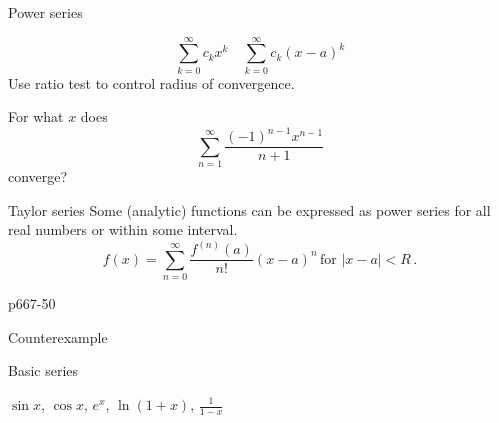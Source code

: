 \begin{frame}{Power series}


\[
\sum_{k=0}^{\infty}c_{k}x^{k}\quad\sum_{k=0}^{\infty}c_{k}\left(x-a\right)^{k}
\]
Use ratio test to control radius of convergence.



\begin{example}
For what $x$ does
\[
\sum_{n=1}^{\infty}\frac{\left(-1\right)^{n-1}x^{n-1}}{n+1}
\]
converge?
\end{example}

\end{frame}

\begin{frame}{Taylor series}
Some (\alert{analytic}) functions can be expressed as power series for all real numbers
or within some interval.
\[
f\left(x\right)=\sum_{n=0}^{\infty}\frac{f^{\left(n\right)}\left(a\right)}{n!}\left(x-a\right)^{n}\,\mbox{for }\left|x-a\right|<R\,.
\]

\begin{example}
p667-50
\end{example}

\end{frame}

\begin{frame}{Counterexample}
\end{frame}

\begin{frame}{Basic series}


$\sin x$, $\cos x$, $e^{x}$, $\ln\left(1+x\right)$, $\frac{1}{1-x}$

\end{frame}

